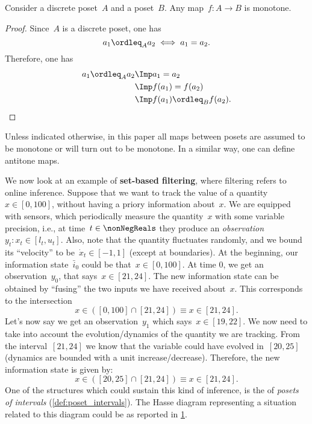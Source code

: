 \begin{lemma}
  Consider a discrete poset~$A$ and a poset~$B$. Any map~$f\colon A\to B$ is monotone.
\end{lemma}
\begin{proof}
  Since~$A$ is a discrete poset, one has
  \begin{equation}
    a_1\ordleq_A a_2 \iff a_1=a_2.
  \end{equation}
  Therefore, one has
  \begin{equation}
    \begin{aligned}
      a_1\ordleq_A a_2 &\Imp a_1=a_2\\
      &\Imp f(a_1)=f(a_2)\\
      &\Imp f(a_1)\ordleq_B f(a_2).
    \end{aligned}
  \end{equation}
\end{proof}
Unless indicated otherwise, in this paper all maps between posets are assumed to be monotone or will turn out to be monotone. In a similar way, one can define antitone maps.


\begin{example}
  We now look at an example of \textbf{set-based filtering}, where filtering refers to online inference.
  Suppose that we want to track the value of a quantity~$x\in [0,100]$, without having a priory information about~$x$.
  We are equipped with sensors, which periodically measure the quantity~$x$ with some variable precision, i.e., at time~$t\in \nonNegReals $ they produce an \emph{observation}~$y_t\colon x_t\in [l_t,u_t]$.
  Also, note that the quantity fluctuates randomly, and we bound its ``velocity'' to be~$\dot{x}_t\in [-1,1]$ (except at boundaries).
  At the beginning, our information state~$\bar{i}_0$ could be that~$x\in [0,100]$.
  At time 0, we get an observation~$y_0$, that says~$x\in [21,24]$.
  The new information state can be obtained by ``fusing'' the two inputs we have received about~$x$. This corresponds to the intersection
  \begin{equation*}
    x\in \left( [0,100] \cap [21,24]\right)\equiv x\in [21,24].
  \end{equation*}
  Let's now say we get an observation~$y_1$ which says~$x\in [19,22]$.
  We now need to take into account the evolution/dynamics of the quantity we are tracking. From the interval~$[21,24]$ we know that the variable could have evolved in~$[20,25]$ (dynamics are bounded with a unit increase/decrease). Therefore, the new information state is given by:
  \begin{equation*}
    x\in \left( [20,25] \cap [21,24]\right)\equiv x\in [21,24].
  \end{equation*}
  One of the structures which could sustain this kind of inference, is the of \emph{posets of intervals} (\cref{def:poset_intervals}).
  The Hasse diagram representing a situation related to this diagram could be as reported in \cref{fig:hasse_filtering}.
  \begin{figure}[h!]
    \begin{center}
    \end{center}
    \caption{\label{fig:hasse_filtering}}
  \end{figure}
\end{example}
